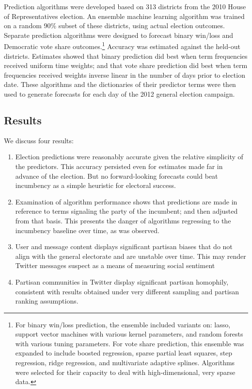 \documentclass{article}
\begin{document}
Prediction algorithms were developed based on 313 districts from the 2010 House of
Representatives election. An ensemble machine learning
algorithm \citep{van2007super} was trained on a random 90\% subset of
these districts, using actual election outcomes. Separate prediction
algorithms were designed to forecast binary win/loss and Democratic
vote share outcomes.\footnote{For binary win/loss
  prediction, the ensemble
included variants on: lasso, support vector machines with various
kernel parameters, and random forests with various tuning
parameters. For vote share prediction, this ensemble was expanded to
include boosted regression, sparse partial least squares, step
regression, ridge regression, and multivariate adaptive splines. Algorithms were selected for their capacity to deal with
high-dimensional, very sparse data.} Accuracy was
estimated against the held-out districts. Estimates showed that binary
prediction did best when term frequencies received uniform time
weights; and that vote share prediction did best when term frequencies
received weights inverse linear in the number of days prior to
election date. These algorithms and the dictionaries of their
predictor terms were then used to generate forecasts for each day of
the 2012 general election campaign.

\subsection{Results}
\label{sec:results}

We discuss four results:
\begin{enumerate}
\item Election predictions were reasonably accurate given the relative
  simplicity of the predictors. This accuracy persisted even for
  estimates made far in advance of the election. But no
  forward-looking forecasts could beat incumbency as a simple
  heuristic for electoral success.
\item Examination of algorithm performance shows that predictions are
  made in reference to terms signaling the party of the incumbent; and
  then adjusted from that basis. This presents the danger of
  algorithms regressing to the incumbency baseline over time, as was observed.
\item User and message content displays significant partisan biases
  that do not align with the general electorate and are unstable over time.
  This may render Twitter messages suspect as a means of measuring
  social sentiment
\item Partisan communities in Twitter display significant partisan
  homophily, consistent with results obtained under very different
  sampling and partisan ranking assumptions. 
\end{enumerate}
\end{document}
